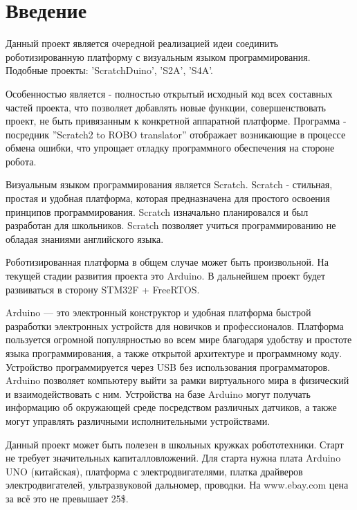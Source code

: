 \section*{Введение}

Данный проект является очередной реализацией идеи соединить роботизированную платформу с визуальным языком программирования. Подобные проекты: 'ScratchDuino', 'S2A', 'S4A'.

Особенностью является - полностью открытый исходный код всех составных частей проекта, что позволяет добавлять новые функции, совершенствовать проект, не быть привязанным к конкретной аппаратной платформе. Программа - посредник ''Scratch2 to ROBO translator'' отображает возникающие в процессе обмена ошибки, что упрощает отладку программного обеспечения на стороне робота.

Визуальным языком программирования является Scratch. Scratch - стильная, простая и удобная платформа, которая предназначена для простого освоения принципов программирования. Scratch изначально планировался и был разработан для школьников. Scratch позволяет учиться программированию не обладая знаниями английского языка.

Роботизированная платформа в общем случае может быть произвольной. На текущей стадии развития проекта это Arduino. В дальнейшем проект будет развиваться в сторону STM32F + FreeRTOS. 

Arduino — это электронный конструктор и удобная платформа быстрой разработки электронных устройств для новичков и профессионалов. Платформа пользуется огромной популярностью во всем мире благодаря удобству и простоте языка программирования, а также открытой архитектуре и программному коду. Устройство программируется через USB без использования программаторов. Arduino позволяет компьютеру выйти за рамки виртуального мира в физический и взаимодействовать с ним. Устройства на базе  Arduino могут получать информацию об окружающей среде посредством различных датчиков, а также могут управлять различными исполнительными устройствами.

Данный проект может быть полезен в школьных кружках робототехники. Старт не требует значительных капиталловложений. Для старта нужна плата Arduino UNO (китайская), платформа с электродвигателями, платка драйверов электродвигателей, ультразвуковой дальномер, проводки. На www.ebay.com цена за всё это не превышает 25\$.



 